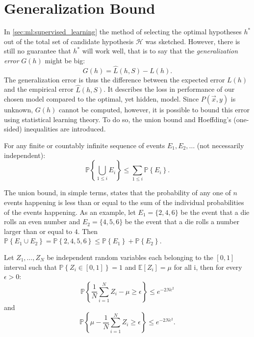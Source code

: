 \section{Generalization Bound}
\label{sec:generalization_bound}
In \autoref{sec:ml:supervised_learning} the method of selecting the optimal hypotheses $h^*$ out of the total set of candidate hypothesis $\mathcal{H}$ was sketched. However, there is still no guarantee that $h^*$ will work well, that is to say that the \emph{generalization error} $G(h)$ might be big:
\begin{equation}
  G(h) = \hat{L}(h, S) - L(h).
\end{equation}
The generalization error is thus the difference between the expected error $L(h)$ and the empirical error $\hat{L}(h, S)$. It describes the loss in performance of our chosen model compared to the optimal, yet hidden, model. Since $P(\vec{x}, y)$ is unknown, $G(h)$ cannot be computed, however, it is possible to bound this error using statistical learning theory. To do so, the union bound and Hoeffding's (one-sided) inequalities are introduced. 
\begin{lemma}
  For any finite or countably infinite sequence of events $E_1, E_2, \dots$ (not necessarily independent): 
  \begin{equation}
    \mathbb{P} \left\{\bigcup_{1 \leq i} E_i \right\} \leq \sum_{1 \leq i} \mathbb{P} \left\{E_i \right \}. 
  \end{equation}
\end{lemma}
The union bound, in simple terms, states that the probability of any one of $n$ events happening is less than or equal to the sum of the individual probabilities of the events happening. As an example, let $E_1=\{2, 4, 6\}$ be the event that a die rolls an even number and $E_2=\{4, 5, 6\}$ be the event that a die rolls a number larger than or equal to $4$. Then $\mathbb{P} \left\{E_1 \cup E_2 \right\} = \mathbb{P} \left\{ 2, 4, 5, 6 \right\} \leq \mathbb{P} \left\{E_1 \right \} + \mathbb{P} \left\{E_2 \right \} $. 
\begin{lemma}
  Let $Z_1, \dots, Z_N$ be independent random variables each belonging to the $[0, 1]$ interval such that $\mathbb{P}\left\{Z_i \in [0, 1] \right\} = 1$ and $\mathbb{E}[Z_i] = \mu$ for all i, then for every $\epsilon > 0$:
  \begin{equation}
    \mathbb{P} \left\{  \frac{1}{N}\sum_{i=1}^N Z_i - \mu \geq \epsilon \right\} \leq e^{-2N\epsilon^2} 
    \label{eq:hoeffding_onesided_a}
  \end{equation}
  and
  \begin{equation}
    \mathbb{P} \left\{ \mu - \frac{1}{N}\sum_{i=1}^N Z_i  \geq \epsilon \right\} \leq e^{-2N\epsilon^2}.
    \label{eq:hoeffding_onesided_b}
  \end{equation}
\end{lemma}

